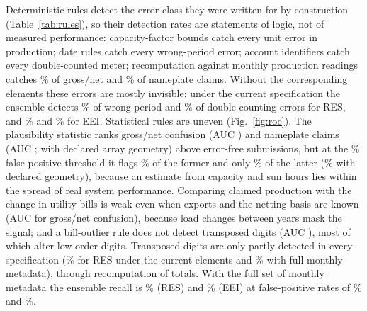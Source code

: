 \documentclass[preprint,12pt]{elsarticle}
\begin{document}
Deterministic rules detect the error class they were written for by construction
(Table~\ref{tab:rules}), so their detection rates are statements of logic, not of
measured performance: capacity-factor bounds
catch every unit error in production; date rules catch every wrong-period error;
account identifiers catch every double-counted meter; recomputation against monthly
production readings catches \DetProductionMeterResGrossNet\% of gross/net and
\DetProductionMeterResNameplate\% of nameplate claims. Without the corresponding
elements these errors are mostly invisible: under the current specification the ensemble
detects \DetCurrentResPeriod\% of wrong-period and \DetCurrentResDouble\% of
double-counting errors for RES, and \DetCurrentEeiPeriod\% and \DetCurrentEeiDouble\% for
EEI. Statistical rules are uneven (Fig.~\ref{fig:roc}). The plausibility statistic
ranks gross/net confusion (AUC \AucPlausGrossNet) and nameplate claims (AUC
\AucPlausNameplate; \AucPlausGeomNameplate{} with declared array geometry) above
error-free submissions, but at the \StatRuleFpr\% false-positive threshold it flags
\DetRulePlausGrossNet\% of the former and only \DetRulePlausNameplate\% of the latter
(\DetRulePlausGeomNameplate\% with declared geometry), because an estimate from capacity
and sun hours lies within the spread of real system performance. Comparing claimed production with the change in utility bills is weak even
when exports and the netting basis are known (AUC \AucBillDiffGrossNet{} for gross/net
confusion), because load changes between years mask the signal; and a bill-outlier rule
does not detect transposed digits (AUC \AucOutlierTransposed), most of which alter
low-order digits. Transposed digits are only partly detected in every specification
(\DetCurrentResTransposed\% for RES under the current elements and
\DetMetadataResTransposed\% with full monthly metadata), through recomputation of
totals. With
the full set of monthly metadata the ensemble recall is \DetMetadataResRecall\% (RES) and
\DetMetadataEeiRecall\% (EEI) at false-positive rates of \DetMetadataResFalsePositive\%
and \DetMetadataEeiFalsePositive\%.

\begin{table}[p]
\caption{Synthetic data. Validation rules, the optional elements they require, their
false-positive rate on error-free submissions (FP, \%) and detection rate (\%) by injected
error class: U unit, T transposed digits, P wrong period, D double counting, G gross/net,
N nameplate $\times$ hours (\NPerClass{} applicants per class). Type: dete.\ deterministic,
stat.\ statistical, diag.\ diagnostic.}\label{tab:rules}
\centering\scriptsize

\end{table}
\end{document}
